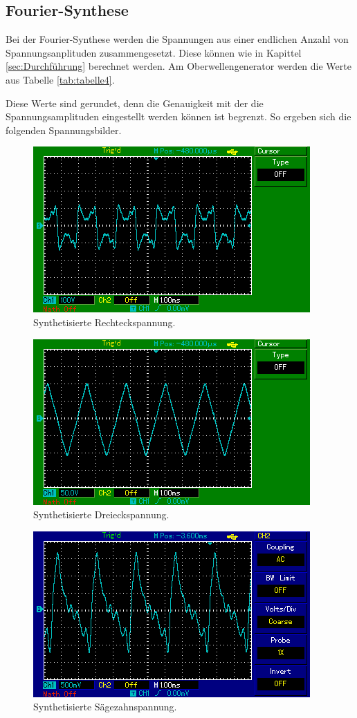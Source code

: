 \subsection{Fourier-Synthese}
Bei der Fourier-Synthese werden die Spannungen aus einer endlichen Anzahl von
Spannungsanplituden zusammengesetzt. Diese können wie in Kapittel \ref{sec:Durchführung}
berechnet werden.
Am Oberwellengenerator werden die Werte aus Tabelle \ref{tab:tabelle4}.

Diese Werte sind gerundet, denn die Genauigkeit mit der die Spannungsamplituden
eingestellt werden können ist begrenzt.
So ergeben sich die folgenden Spannungsbilder. \\
\begin{figure}[H]
  \centering
  \includegraphics{recht.png}
  \caption{Synthetisierte Rechteckspannung.}
  \label{fig:Rechteck}
\end{figure}

\begin{figure}[H]
  \centering
  \includegraphics{drei.png}
  \caption{Synthetisierte Dreieckspannung.}
  \label{fig:Dreieck}
\end{figure}

\begin{figure}
  \centering
  \includegraphics{sag.png}
  \caption{Synthetisierte Sägezahnspannung.}
  \label{fig:Säge}
\end{figure}

